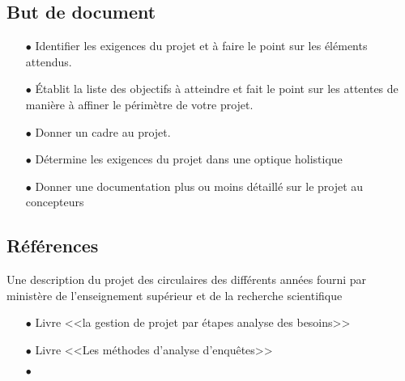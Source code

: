 \subsection{But de document}
\begin{itemize}
    \item[$\bullet$] Identifier les exigences du projet et à faire le point sur les éléments attendus.
    \item[$\bullet$] Établit la liste des objectifs à atteindre et fait le point sur les attentes de manière à affiner le périmètre de votre projet.
    \item[$\bullet$] Donner un cadre au projet.
    \item[$\bullet$] Détermine les exigences du projet dans une optique holistique
    \item[$\bullet$] Donner une documentation plus ou moins détaillé sur le projet au concepteurs
\end{itemize}

\subsection{Références}
Une description du projet des circulaires des différents années fourni par
ministère de l’enseignement supérieur et de la recherche scientifique
\begin{itemize}
    \item[$\bullet$] Livre <<la gestion de projet par étapes analyse des besoins>>
    \item[$\bullet$] Livre <<Les méthodes d’analyse d’enquêtes>>
    \item[$\bullet$] \href{https://asana.com/fr?noredirect=https://www.academia.edu/10419373/LA_GESTION_DE_PROJET_PAR_ÉTAPES_ANAL}{}
\end{itemize}